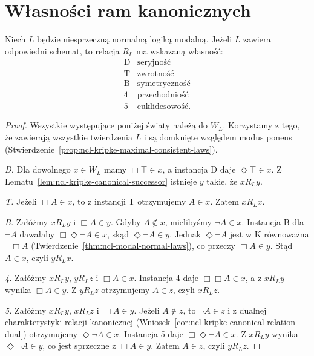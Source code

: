 \section{Własności ram kanonicznych}

\begin{twierdzenie}
\label{thm:ncl-kripke-canonical-frame-properties}
Niech $L$ będzie niesprzeczną normalną logiką
modalną. Jeżeli $L$ zawiera odpowiedni schemat,
to relacja $R_L$ ma wskazaną własność:
\[
\begin{array}{c|l}
 \mathrm D&\text{seryjność}\\
 \mathrm T&\text{zwrotność}\\
 \mathrm B&\text{symetryczność}\\
 4&\text{przechodniość}\\
 5&\text{euklidesowość}.
\end{array}
\]
\end{twierdzenie}
\begin{proof}
Wszystkie występujące poniżej światy należą
do $W_L$. Korzystamy z tego, że zawierają
wszystkie twierdzenia $L$ i są domknięte
względem modus ponens
(Stwierdzenie~\ref{prop:ncl-kripke-maximal-consistent-laws}).

\emph{D.} Dla dowolnego $x\in W_L$ mamy
$\Box\top\in x$, a instancja D daje
$\Diamond\top\in x$. Z
Lematu~\ref{lem:ncl-kripke-canonical-successor}
istnieje $y$ takie, że $xR_Ly$.

\emph{T.} Jeżeli $\Box A\in x$, to
z instancji T otrzymujemy $A\in x$.
Zatem $xR_Lx$.

\emph{B.} Załóżmy $xR_Ly$ i $\Box A\in y$.
Gdyby $A\notin x$, mielibyśmy $\neg A\in x$.
Instancja B dla $\neg A$ dawałaby
$\Box\Diamond\neg A\in x$, skąd
$\Diamond\neg A\in y$.
Jednak $\Diamond\neg A$ jest w K równoważna
$\neg\Box A$
(Twierdzenie~\ref{thm:ncl-modal-normal-laws}),
co przeczy $\Box A\in y$.
Stąd $A\in x$, czyli $yR_Lx$.

\emph{4.} Załóżmy $xR_Ly$, $yR_Lz$
i $\Box A\in x$. Instancja 4 daje
$\Box\Box A\in x$, a z $xR_Ly$ wynika
$\Box A\in y$. Z $yR_Lz$ otrzymujemy
$A\in z$, czyli $xR_Lz$.

\emph{5.} Załóżmy $xR_Ly$, $xR_Lz$
i $\Box A\in y$. Jeżeli $A\notin z$,
to $\neg A\in z$ i z dualnej charakterystyki
relacji kanonicznej
(Wniosek~\ref{cor:ncl-kripke-canonical-relation-dual})
otrzymujemy $\Diamond\neg A\in x$.
Instancja 5 daje $\Box\Diamond\neg A\in x$.
Z $xR_Ly$ wynika $\Diamond\neg A\in y$,
co jest sprzeczne z $\Box A\in y$.
Zatem $A\in z$, czyli $yR_Lz$.
\end{proof}

